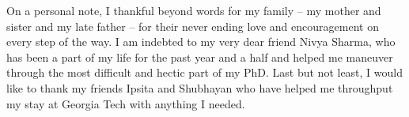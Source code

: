 \begin{acknowledgments}
\par On a personal note, I thankful beyond words for my family -- my mother and sister and my late father -- for their never ending love and encouragement on every step of the way. I am indebted to my very dear friend Nivya Sharma, who has been a part of my life for the past year and a half and helped me maneuver through the most difficult and hectic part of my PhD. Last but not least, I would like to thank my friends Ipsita and Shubhayan who have helped me throughput my stay at Georgia Tech with anything I needed.
\end{acknowledgments}

